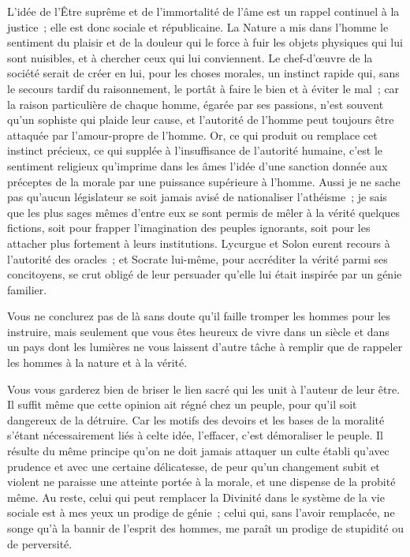 \documentclass[french,twoside]{book} %
\begin{document}
L’idée de l’Être suprême et de l’immortalité de l’âme est un rappel continuel à la justice ; elle est donc sociale et républicaine. La Nature a mis dans l’homme le sentiment du plaisir et de la douleur qui le force à fuir les objets physiques qui lui sont nuisibles, et à chercher ceux qui lui conviennent. Le chef-d’œuvre de la société serait de créer en lui, pour les choses morales, un instinct rapide qui, sans le secours tardif du raisonnement, le portât à faire le bien et à éviter le mal ; car la raison particulière de chaque homme, égarée par ses passions, n’est souvent qu’un sophiste qui plaide leur cause, et l’autorité de l’homme peut toujours être attaquée par l’amour-propre de l’homme. Or, ce qui produit ou remplace cet instinct précieux, ce qui supplée à l’insuffisance de l’autorité humaine, c’est le sentiment religieux qu’imprime dans les âmes l’idée d’une sanction donnée aux préceptes de la morale par une puissance supérieure à l’homme. Aussi je ne sache pas qu’aucun législateur se soit jamais avisé de nationaliser l’athéisme ; je sais que les plus sages mêmes d’entre eux se sont permis de mêler à la vérité quelques fictions, soit pour frapper l’imagination des peuples ignorants, soit pour les attacher plus fortement à leurs institutions. Lycurgue et Solon eurent recours à l’autorité des oracles ; et Socrate lui-même, pour accréditer la vérité parmi ses concitoyens, se crut obligé de leur persuader qu’elle lui était inspirée par un génie familier.\par
Vous ne conclurez pas de là sans doute qu’il faille tromper les hommes pour les instruire, mais seulement que vous êtes heureux de vivre dans un siècle et dans un pays dont les lumières ne vous laissent d’autre tâche à remplir que de rappeler les hommes à la nature et à la vérité.\par
Vous vous garderez bien de briser le lien sacré qui les unit à l’auteur de leur être. Il suffit même que cette opinion ait régné chez un peuple, pour qu’il soit dangereux de la détruire. Car les motifs des devoirs et les bases de la moralité s’étant nécessairement liés à celte idée, l’effacer, c’est démoraliser le peuple. Il résulte du même principe qu’on ne doit jamais attaquer un culte établi qu’avec prudence et avec une certaine délicatesse, de peur qu’un changement subit et violent ne paraisse une atteinte portée à la morale, et une dispense de la probité même. Au reste, celui qui peut remplacer la Divinité dans le système de la vie sociale est à mes yeux un prodige de génie ; celui qui, sans l’avoir remplacée, ne songe qu’à la bannir de l’esprit des hommes, me paraît un prodige de stupidité ou de perversité.\par
\end{document}
